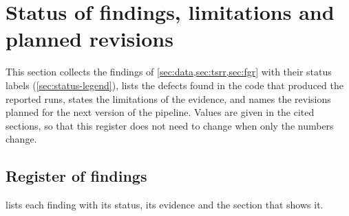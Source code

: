 \section{Status of findings, limitations and planned revisions}\label{sec:status}

This section collects the findings of \cref{sec:data,sec:tsrr,sec:fgr} with their status labels (\cref{sec:status-legend}), lists the defects found in the code that produced the reported runs, states the limitations of the evidence, and names the revisions planned for the next version of the pipeline. Values are given in the cited sections, so that this register does not need to change when only the numbers change.

\subsection{Register of findings}\label{sec:status-register}

 lists each finding with its status, its evidence and the section that shows it.

